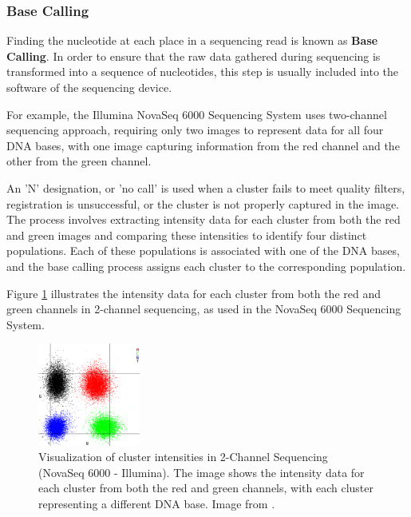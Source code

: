 \subsubsection{\textbf{Base Calling}} \label{subsubsec:ngs_basecalling}

Finding the nucleotide at each place in a sequencing read is known as \textbf{Base Calling}. In order to ensure that the raw data gathered during sequencing is transformed into a sequence of nucleotides, this step is usually included into the software of the sequencing device. \cite{Rehm2013} 

For example, the Illumina NovaSeq 6000 Sequencing System uses two-channel sequencing approach, requiring only two images to represent data for all four DNA bases, with one image capturing information from the red channel and the other from the green channel. \cite{NovaSeq}

An 'N' designation, or 'no call' is used when a cluster fails to meet quality filters, registration is unsuccessful, or the cluster is not properly captured in the image. The process involves extracting intensity data for each cluster from both the red and green images and comparing these intensities to identify four distinct populations. Each of these populations is associated with one of the DNA bases, and the base calling process assigns each cluster to the corresponding population. \cite{NovaSeq}

Figure \ref{fig:cluster} illustrates the intensity data for each cluster from both the red and green channels in 2-channel sequencing, as used in the NovaSeq 6000 Sequencing System.

\begin{figure}[H]
    \centering
    \includegraphics[width=0.3\textwidth]{figs/ClusterIntensities.png}
    \caption{Visualization of cluster intensities in 2-Channel Sequencing (NovaSeq 6000 - Illumina). The image shows the intensity data for each cluster from both the red and green channels, with each cluster representing a different DNA base. Image from \cite{NovaSeq}.} 
    \label{fig:cluster}
\end{figure}

